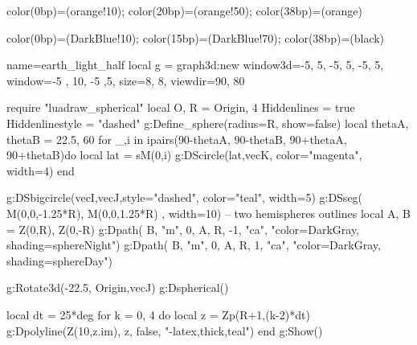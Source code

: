 \documentclass{standalone}
\begin{document}
{\pgfpoint{20 bp}{0 bp}}
{color(0bp)=(orange!10); color(20bp)=(orange!50); color(38bp)=(orange)}%

{\pgfpoint{50 bp}{0 bp}}
{color(0bp)=(DarkBlue!10); color(15bp)=(DarkBlue!70); color(38bp)=(black)}%

\begin{luadraw}{name=earth_light_half}
local g = graph3d:new{
    window3d={-5, 5, -5, 5, -5, 5},
    window={-5 , 10, -5 ,5},
    size={8, 8},
    viewdir={90, 80}
}

require "luadraw_spherical"
local O, R = Origin, 4
Hiddenlines = true
Hiddenlinestyle = "dashed"
g:Define_sphere({radius=R, show=false})
local thetaA, thetaB = 22.5, 60
for _,i in ipairs({90-thetaA, 90-thetaB, 90+thetaA, 90+thetaB})do
    local lat = sM(0,i)
    g:DScircle({lat,vecK}, {color="magenta", width=4})
end

g:DSbigcircle({vecI,vecJ},{style="dashed", color="teal", width=5})
g:DSseg({ M(0,0,-1.25*R), M(0,0,1.25*R) }, {width=10})
-- two hemispheres outlines
local A, B = Z(0,R), Z(0,-R)
g:Dpath({ B, "m", 0, A, R, -1, "ca"}, "color=DarkGray, shading=sphereNight")
g:Dpath({ B, "m", 0, A, R, 1, "ca"}, "color=DarkGray, shading=sphereDay")

g:Rotate3d(-22.5, {Origin,vecJ})
g:Dspherical()

local dt = 25*deg
for k = 0, 4 do
    local z = Zp(R+1,(k-2)*dt)
    g:Dpolyline({Z(10,z.im), z}, false, "-latex,thick,teal")
end
g:Show()
\end{luadraw}
\end{document}
